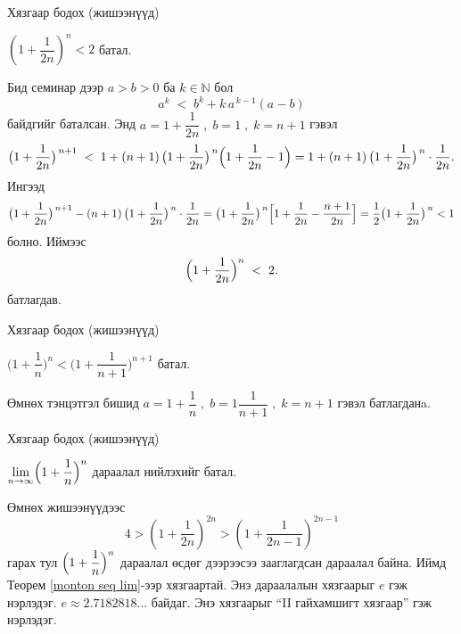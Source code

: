 \begin{frame}[allowframebreaks]{Хязгаар бодох (жишээнүүд)}
\begin{example}
    $(1+\dfrac{1}{2n})^n<2$ батал.

Бид семинар дээр $a>b>0$ ба $k\in\mathbb{N}$ бол 
\[
a^k \;<\;b^k+ k\,a^{\,k-1}(a-b)
\] байдгийг баталсан. Энд $a=1+\dfrac{1}{2n}  \;, \; b=1 \;, \;k=n+1$ гэвэл \[
\bigl( 1+\dfrac{1}{2n}\bigr) ^{\,n+1} \;<\; 1+(n+1)\,\bigl(1+\dfrac{1}{2n}\bigr)^{\,n}\Bigl(1+\dfrac{1}{2n}-1\Bigr)=1+(n+1)\,\bigl(1+\dfrac{1}{2n}\bigr)^{\,n}\cdot \frac{1}{2n}.
\]
Ингээд
\[
\bigl( 1+\dfrac{1}{2n}\bigr) ^{\,n+1}-(n+1)\,\bigl(1+\dfrac{1}{2n}\bigr)^{\,n}\cdot \frac{1}{2n}=\bigl(1+\dfrac{1}{2n}\bigr)^{\,n}\Bigl[1+\dfrac{1}{2n}-\dfrac{n+1}{2n}\Bigr] =\dfrac{1}{2}\bigl(1+\dfrac{1}{2n}\bigr)^{\,n}<1
\]
болно. Иймээс
\[
\Bigl(1+\frac{1}{2n}\Bigr)^{n} \;<\;2.
\]
батлагдав.
\end{example}
\end{frame}

\begin{frame}[allowframebreaks]{Хязгаар бодох (жишээнүүд)}
\begin{example}
    $\bigl(1+\dfrac{1}{n}\bigr)^n<\bigl(1+\dfrac{1}{n+1}\bigr)^{n+1}$ батал.

Өмнөх тэнцэтгэл бишид $a=1+\dfrac{1}{n}  \;, \; b=1\dfrac{1}{n+1} \;, \;k=n+1$ гэвэл батлагданa. 
\end{example}
\end{frame}

\begin{frame}[allowframebreaks]{Хязгаар бодох (жишээнүүд)}
\begin{example}
     $\lim\limits_{n\to\infty}\Bigl(1+\dfrac{1}{n}\Bigr)^n$ дараалал нийлэхийг батал.

Өмнөх жишээнүүдээс $$4>(1+\dfrac{1}{2n})^{2n}>(1+\dfrac{1}{2n-1})^{2n-1}$$ гарах тул $\Bigl(1+\dfrac{1}{n}\Bigr)^n$ дараалал өсдөг дээрээсээ зааглагдсан дараалал байна. Иймд Теорем \ref{monton seq lim}-ээр хязгаартай. Энэ дараалалын хязгаарыг $e$ гэж нэрлэдэг.  $e\approx 2.7182818\dots$ байдаг.
     Энэ хязгаарыг “II гайхамшигт хязгаар” гэж нэрлэдэг.
\end{example}
\end{frame}


